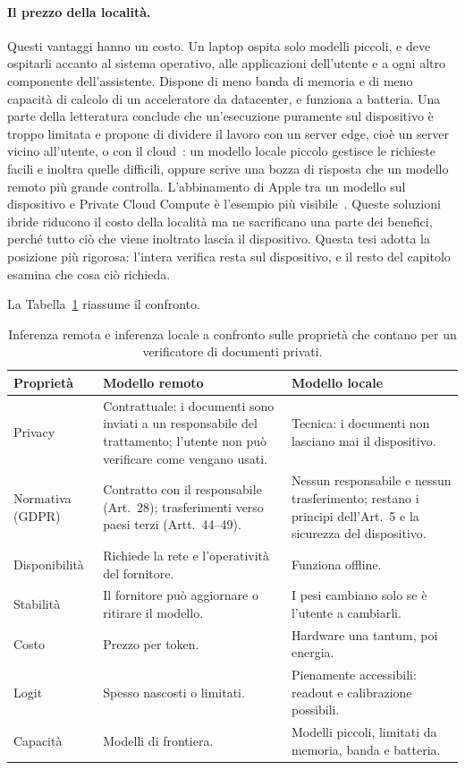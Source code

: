 \paragraph{Il prezzo della località.} Questi vantaggi hanno un costo. Un laptop ospita solo modelli piccoli, e deve
ospitarli accanto al sistema operativo, alle applicazioni dell'utente e a ogni altro componente dell'assistente. Dispone
di meno banda di memoria e di meno capacità di calcolo di un acceleratore da datacenter, e funziona a batteria. Una parte
della letteratura conclude che un'esecuzione puramente sul dispositivo è troppo limitata e propone di dividere il lavoro
con un server edge, cioè un server vicino all'utente, o con il cloud~\cite{qu2025mobileedge,li2025collaborative}: un modello locale piccolo gestisce le
richieste facili e inoltra quelle difficili, oppure scrive una bozza di risposta che un modello remoto più grande
controlla. L'abbinamento di Apple tra un modello sul dispositivo e Private Cloud Compute è l'esempio più
visibile~\cite{gunter2024apple,apple2024pcc}. Queste soluzioni ibride riducono il costo della località ma ne sacrificano
una parte dei benefici, perché tutto ciò che viene inoltrato lascia il dispositivo. Questa tesi adotta la posizione più
rigorosa: l'intera verifica resta sul dispositivo, e il resto del capitolo esamina che cosa ciò richieda.

La Tabella~\ref{tab:local-tradeoff} riassume il confronto.

\begin{table}[htbp]
\centering
\caption{Inferenza remota e inferenza locale a confronto sulle proprietà che contano per un verificatore di documenti
privati.}
\label{tab:local-tradeoff}
\small
\begin{tabularx}{\textwidth}{@{}l>{\raggedright\arraybackslash}X>{\raggedright\arraybackslash}X@{}}
\toprule
Proprietà & Modello remoto & Modello locale \\
\midrule
Privacy & Contrattuale: i documenti sono inviati a un responsabile del trattamento; l'utente non può verificare come
vengano usati. & Tecnica: i documenti non lasciano mai il dispositivo. \\
Normativa (GDPR) & Contratto con il responsabile (Art.~28); trasferimenti verso paesi terzi (Artt.~44--49). & Nessun
responsabile e nessun trasferimento; restano i principi dell'Art.~5 e la sicurezza del dispositivo. \\
Disponibilità & Richiede la rete e l'operatività del fornitore. & Funziona offline. \\
Stabilità & Il fornitore può aggiornare o ritirare il modello. & I pesi cambiano solo se è l'utente a cambiarli. \\
Costo & Prezzo per token. & Hardware una tantum, poi energia. \\
Logit & Spesso nascosti o limitati. & Pienamente accessibili: readout e calibrazione possibili. \\
Capacità & Modelli di frontiera. & Modelli piccoli, limitati da memoria, banda e batteria. \\
\bottomrule
\end{tabularx}
\end{table}

